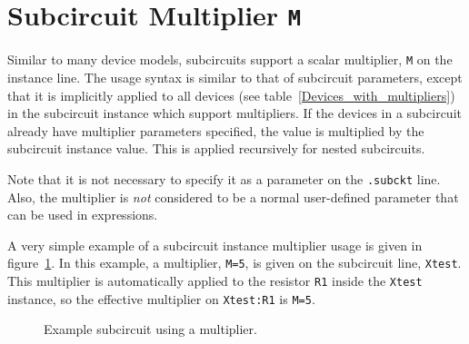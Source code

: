 \section{Subcircuit Multiplier \texttt{M}}
\label{subcircuit_multiplier}

Similar to many device models, subcircuits support a scalar multiplier, \texttt{M} on the instance line.
The usage syntax is similar to that of subcircuit parameters, except that it is 
implicitly applied to all devices (see table~\ref{Devices_with_multipliers}) in 
the subcircuit instance which support multipliers.
If the devices in a subcircuit already have multiplier parameters specified, 
the value is multiplied by the subcircuit instance value.  This is applied recursively 
for nested subcircuits.

Note that it is not necessary to specify it as a parameter on the \texttt{.subckt} line.  
Also, the multiplier is \emph{not} considered to be a normal user-defined parameter that can be 
used in expressions.

A very simple example of a subcircuit instance multiplier usage is given in figure~\ref{Subcircuit_Multiplier_Example_1}.  In this example, a multiplier, \texttt{M=5}, is given on the subcircuit line, \texttt{Xtest}.   This multiplier is automatically applied to the resistor \texttt{R1} inside the \texttt{Xtest} instance, so the effective multiplier on \texttt{Xtest:R1} is \texttt{M=5}.
\begin{figure}[H]
\begin{centering}
\caption{Example subcircuit using a multiplier.\label{Subcircuit_Multiplier_Example_1}}
\end{centering}
\end{figure}

